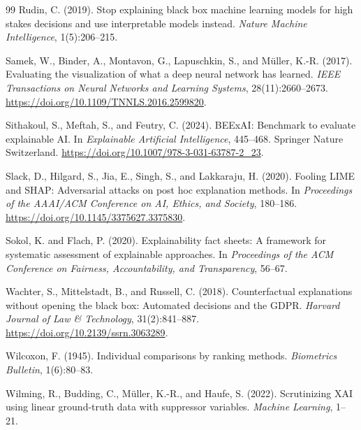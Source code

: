 \documentclass[twoside,11pt]{article}
\begin{document}
\begin{thebibliography}{99}
Rudin, C. (2019).
Stop explaining black box machine learning models for high stakes
decisions and use interpretable models instead.
\emph{Nature Machine Intelligence}, 1(5):206--215.

Samek, W., Binder, A., Montavon, G., Lapuschkin, S., and
M\"{u}ller, K.-R. (2017).
Evaluating the visualization of what a deep neural network has learned.
\emph{IEEE Transactions on Neural Networks and Learning Systems},
28(11):2660--2673.
\url{https://doi.org/10.1109/TNNLS.2016.2599820}.

Sithakoul, S., Meftah, S., and Feutry, C. (2024).
BEExAI: Benchmark to evaluate explainable AI.
In \emph{Explainable Artificial Intelligence}, 445--468.
Springer Nature Switzerland.
\url{https://doi.org/10.1007/978-3-031-63787-2_23}.

Slack, D., Hilgard, S., Jia, E., Singh, S., and Lakkaraju, H. (2020).
Fooling {LIME} and {SHAP}: Adversarial attacks on post hoc explanation
methods.
In \emph{Proceedings of the AAAI/ACM Conference on AI, Ethics, and
Society}, 180--186.
\url{https://doi.org/10.1145/3375627.3375830}.

Sokol, K. and Flach, P. (2020).
Explainability fact sheets: A framework for systematic assessment of
explainable approaches.
In \emph{Proceedings of the ACM Conference on Fairness, Accountability,
and Transparency}, 56--67.

Wachter, S., Mittelstadt, B., and Russell, C. (2018).
Counterfactual explanations without opening the black box: Automated
decisions and the {GDPR}.
\emph{Harvard Journal of Law \& Technology}, 31(2):841--887.
\url{https://doi.org/10.2139/ssrn.3063289}.

Wilcoxon, F. (1945).
Individual comparisons by ranking methods.
\emph{Biometrics Bulletin}, 1(6):80--83.

Wilming, R., Budding, C., M\"{u}ller, K.-R., and Haufe, S. (2022).
Scrutinizing {XAI} using linear ground-truth data with suppressor variables.
\emph{Machine Learning}, 1--21.


\end{thebibliography}
\end{document}
